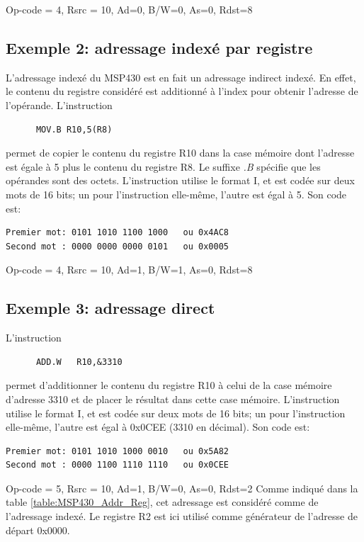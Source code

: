 Op-code = 4, Rsrc = 10, Ad=0, B/W=0, As=0, Rdst=8

\subsection{Exemple 2: adressage indexé par registre}
L'adressage indexé du MSP430 est en fait un adressage indirect indexé. En effet, le contenu du registre considéré est additionné à l'index pour obtenir l'adresse de l'opérande. L'instruction
\lstset{style=customc}
\begin{lstlisting}
      MOV.B R10,5(R8)
\end{lstlisting}
permet de copier le contenu du registre R10 dans la case mémoire dont l'adresse est égale à 5 plus le contenu du registre R8. Le suffixe \textit{.B} spécifie que les opérandes sont des octets.
L'instruction utilise le format I, et est codée sur deux mots de 16 bits; un pour l'instruction elle-même, l'autre est égal à 5.
Son code est:
\lstset{style=customc}
\begin{lstlisting}
Premier mot: 0101 1010 1100 1000   ou 0x4AC8
Second mot : 0000 0000 0000 0101   ou 0x0005
\end{lstlisting}

Op-code = 4, Rsrc = 10, Ad=1, B/W=1, As=0, Rdst=8

\subsection{Exemple 3: adressage direct}
L'instruction
\lstset{style=customc}
\begin{lstlisting}
      ADD.W   R10,&3310
\end{lstlisting}
permet d'additionner le contenu du registre R10 à celui de la case mémoire d'adresse 3310 et de placer le résultat dans cette case mémoire.
L'instruction utilise le format I, et est codée sur deux mots de 16 bits; un pour l'instruction elle-même, l'autre est égal à 0x0CEE (3310 en décimal).
Son code est:
\lstset{style=customc}
\begin{lstlisting}
Premier mot: 0101 1010 1000 0010   ou 0x5A82
Second mot : 0000 1100 1110 1110   ou 0x0CEE
\end{lstlisting}

Op-code = 5, Rsrc = 10, Ad=1, B/W=0, As=0, Rdst=2
Comme indiqué dans la table \ref{table:MSP430_Addr_Reg}, cet adressage est considéré comme de l'adressage indexé. Le registre R2 est ici utilisé comme générateur de l'adresse de départ 0x0000.

